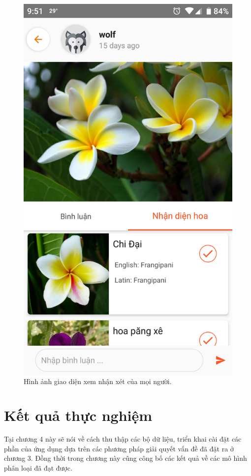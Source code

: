\documentclass[12pt]{report}
\begin{document}
\begin{figure}[h]
			\includegraphics[scale=0.2]{app_comment2}
			\caption{Hình ảnh giao diện xem nhận xét của mọi người.}
			\label{fig:app_comment}
		\end{figure}\newpage		
		
		
											
		\chapter{Kết quả thực nghiệm}
		\label{chap:Experimental results}
		Tại chương 4 này sẽ nói về cách thu thập các bộ dữ liệu, triển khai cài đặt các phần của ứng dụng dựa trên các phương pháp giải quyết vấn đề đã đặt ra ở chương 3.
		Đồng thời trong chương này cũng công bố các kết quả về các mô hình phân loại đã đạt được.
		
\end{document}
